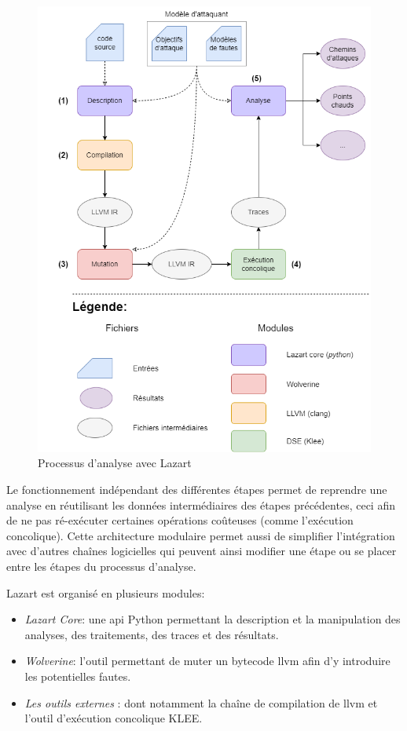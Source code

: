         \begin{figure}[!ht]\centering
            \includegraphics[scale=0.4]{ch3-lazart/img/lazart-workflow4_pack.drawio.png}
            \caption{Processus d'analyse avec Lazart}  \label{fig:lazart-analysis-scheme}
        \end{figure}
        
        Le fonctionnement indépendant des différentes étapes permet de reprendre une analyse en réutilisant les données intermédiaires des étapes précédentes, ceci afin de ne pas ré-exécuter certaines opérations coûteuses (comme l'exécution concolique). 
        Cette architecture modulaire permet aussi de simplifier l'intégration avec d'autres chaînes logicielles qui peuvent ainsi modifier une étape ou se placer entre les étapes du processus d'analyse. 
        
        Lazart est organisé en plusieurs modules: 
        \begin{itemize}
            \item \textit{Lazart Core}: une \gls{api} Python permettant la description et la manipulation des analyses, des traitements, des traces et des résultats.
            \item \textit{Wolverine}: l'outil permettant de muter un bytecode \gls{llvm} afin d'y introduire les potentielles fautes.
            \item \textit{Les outils externes} : dont notamment la chaîne de compilation de \gls{llvm} et l'outil d'exécution concolique KLEE.
        \end{itemize}
    
